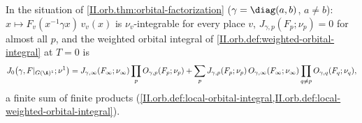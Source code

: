 In the situation of \cref{II.orb.thm:orbital-factorization} ($\gamma=\diag(a,b)$, $a\neq b$): $x\mapsto F_v(x^{-1}\gamma x)\,v_v(x)$ is $\nu_v$-integrable for every place $v$,
$J_{\gamma,p}(F_p;\nu_p)=0$ for almost all $p$, and the weighted orbital integral of \cref{II.orb.def:weighted-orbital-integral} at $T=0$ is
\[
  J_0\bigl(\gamma,F|_{G(\A)^1};\nu^1\bigr)=J_{\gamma,\infty}(F_\infty;\nu_\infty)\prod_pO_{\gamma,p}(F_p;\nu_p)
  +\sum_pJ_{\gamma,p}(F_p;\nu_p)\,O_{\gamma,\infty}(F_\infty;\nu_\infty)\prod_{q\neq p}O_{\gamma,q}(F_q;\nu_q),
\]
a finite sum of finite products (\cref{II.orb.def:local-orbital-integral,II.orb.def:local-weighted-orbital-integral}).
